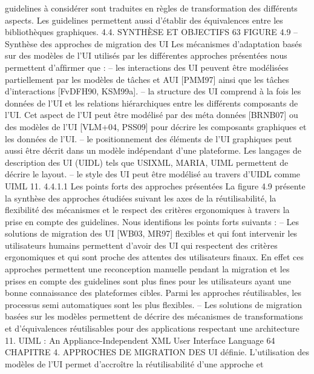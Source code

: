 \documentclass{article}
\begin{document}
guidelines \`{a} consid\'{e}rer sont traduites en r\`{e}gles de transformation des diff\'{e}rents aspects. Les guidelines permettent aussi d’\'{e}tablir des \'{e}quivalences entre les biblioth\`{e}ques graphiques.
4.4. SYNTHÈSE ET OBJECTIFS
63
FIGURE 4.9 – Synth\`{e}se des approches de migration des UI
Les m\'{e}canismes d’adaptation bas\'{e}s sur des mod\`{e}les de l’UI utilis\'{e}s par les diff\'{e}rentes approches
pr\'{e}sent\'{e}es nous permettent d’afﬁrmer que :
– les interactions des UI peuvent \^{e}tre mod\'{e}lis\'{e}es partiellement par les mod\`{e}les de t\^{a}ches et
AUI [PMM97] ainsi que les t\^{a}ches d’interactions [FvDFH90, KSM99a].
– la structure des UI comprend \`{a} la fois les donn\'{e}es de l’UI et les relations hi\'{e}rarchiques entre
les diff\'{e}rents composants de l’UI. Cet aspect de l’UI peut \^{e}tre mod\'{e}lis\'{e} par des m\'{e}ta donn\'{e}es [BRNB07] ou des mod\`{e}les de l’UI [VLM+04, PSS09] pour d\'{e}crire les composants graphiques et les donn\'{e}es de l’UI.
– le positionnement des \'{e}l\'{e}ments de l’UI graphiques peut aussi \^{e}tre d\'{e}crit dans un mod\`{e}le ind\'{e}pendant d’une plateforme. Les langages de description des UI (UIDL) tels que USIXML,
MARIA, UIML permettent de d\'{e}crire le layout.
– le style des UI peut \^{e}tre mod\'{e}lis\'{e} au travers d’UIDL comme UIML 11.
4.4.1.1
Les points forts des approches pr\'{e}sent\'{e}es
La ﬁgure 4.9 pr\'{e}sente la synth\`{e}se des approches \'{e}tudi\'{e}es suivant les axes de la r\'{e}utilisabilit\'{e}, la
ﬂexibilit\'{e} des m\'{e}canismes et le respect des crit\`{e}res ergonomiques \`{a} travers la prise en compte des
guidelines. Nous identiﬁons les points forts suivants :
– Les solutions de migration des UI [WB03, MR97] ﬂexibles et qui font intervenir les utilisateurs humains permettent d’avoir des UI qui respectent des crit\`{e}res ergonomiques et qui sont
proche des attentes des utilisateurs ﬁnaux. En effet ces approches permettent une reconception
manuelle pendant la migration et les prises en compte des guidelines sont plus ﬁnes pour les
utilisateurs ayant une bonne connaissance des plateformes cibles. Parmi les approches r\'{e}utilisables, les processus semi automatiques sont les plus ﬂexibles.
– Les solutions de migration bas\'{e}es sur les mod\`{e}les permettent de d\'{e}crire des m\'{e}canismes de
transformations et d’\'{e}quivalences r\'{e}utilisables pour des applications respectant une architecture
11. UIML : An Appliance-Independent XML User Interface Language
64
CHAPITRE 4. APPROCHES DE MIGRATION DES UI
d\'{e}ﬁnie. L’utilisation des mod\`{e}les de l’UI permet d’accro\^{i}tre la r\'{e}utilisabilit\'{e} d’une approche et
\end{document}
